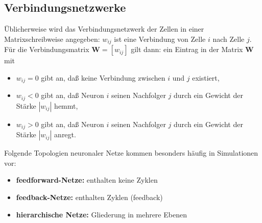 \subsection*{Verbindungsnetzwerke}
Üblicherweise wird das Verbindungsnetzwerk der Zellen in
einer Matrixschreibweise angegeben: $w_{ij}$ ist eine Verbindung von Zelle $i$ nach Zelle $j$. Für die Verbindungsmatrix $\textbf{W} = [w_{ij}]$ gilt dann: ein Eintrag in der Matrix $\textbf{W}$ mit
\begin{itemize}
\item $w_{ij} = 0$ gibt an, daß keine Verbindung zwischen $i$ und $j$ existiert,
\item $w_{ij} < 0$ gibt an, daß Neuron $i$ seinen Nachfolger $j$ durch ein Gewicht der
Stärke $|w_{ij}|$ hemmt,
\item $w_{ij} > 0$ gibt an, daß Neuron $i$ seinen Nachfolger $j$ durch ein Gewicht der
Stärke $|w_{ij}|$ anregt.
\end{itemize}

Folgende Topologien neuronaler Netze kommen besonders häufig in Simulationen vor:
\begin{itemize}
\item \textbf{feedforward-Netze:} enthalten keine Zyklen
\item \textbf{feedback-Netze:} enthalten Zyklen (feedback)
\item \textbf{hierarchische Netze:} Gliederung in mehrere Ebenen
\end{itemize}

